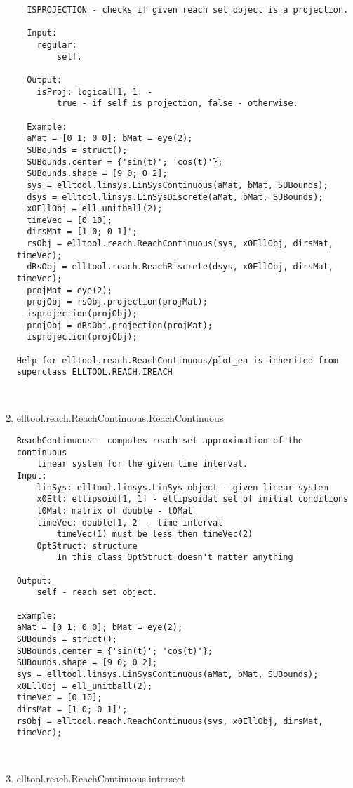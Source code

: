 \begin{enumerate}
\begin{lstlisting}
  ISPROJECTION - checks if given reach set object is a projection.

  Input:
    regular:
        self.

  Output:
    isProj: logical[1, 1] -
        true - if self is projection, false - otherwise.

  Example:
  aMat = [0 1; 0 0]; bMat = eye(2);
  SUBounds = struct();
  SUBounds.center = {'sin(t)'; 'cos(t)'};
  SUBounds.shape = [9 0; 0 2];
  sys = elltool.linsys.LinSysContinuous(aMat, bMat, SUBounds);
  dsys = elltool.linsys.LinSysDiscrete(aMat, bMat, SUBounds);
  x0EllObj = ell_unitball(2);
  timeVec = [0 10];
  dirsMat = [1 0; 0 1]';
  rsObj = elltool.reach.ReachContinuous(sys, x0EllObj, dirsMat, timeVec);
  dRsObj = elltool.reach.ReachRiscrete(dsys, x0EllObj, dirsMat, timeVec);
  projMat = eye(2);
  projObj = rsObj.projection(projMat);
  isprojection(projObj);
  projObj = dRsObj.projection(projMat);
  isprojection(projObj);

Help for elltool.reach.ReachContinuous/plot_ea is inherited from superclass ELLTOOL.REACH.IREACH



\end{lstlisting}
\fontfamily{\familydefault}
\selectfont
\item {elltool.reach.ReachContinuous.ReachContinuous}
\selectfont
\begin{lstlisting}
ReachContinuous - computes reach set approximation of the continuous
    linear system for the given time interval.
Input:
    linSys: elltool.linsys.LinSys object - given linear system
    x0Ell: ellipsoid[1, 1] - ellipsoidal set of initial conditions
    l0Mat: matrix of double - l0Mat
    timeVec: double[1, 2] - time interval
        timeVec(1) must be less then timeVec(2)
    OptStruct: structure
        In this class OptStruct doesn't matter anything

Output:
    self - reach set object.

Example:
aMat = [0 1; 0 0]; bMat = eye(2);
SUBounds = struct();
SUBounds.center = {'sin(t)'; 'cos(t)'};
SUBounds.shape = [9 0; 0 2];
sys = elltool.linsys.LinSysContinuous(aMat, bMat, SUBounds);
x0EllObj = ell_unitball(2);
timeVec = [0 10];
dirsMat = [1 0; 0 1]';
rsObj = elltool.reach.ReachContinuous(sys, x0EllObj, dirsMat, timeVec);



\end{lstlisting}
\fontfamily{\familydefault}
\selectfont
\item {elltool.reach.ReachContinuous.intersect}
\selectfont
\begin{lstlisting}


\end{lstlisting}
\end{enumerate}
